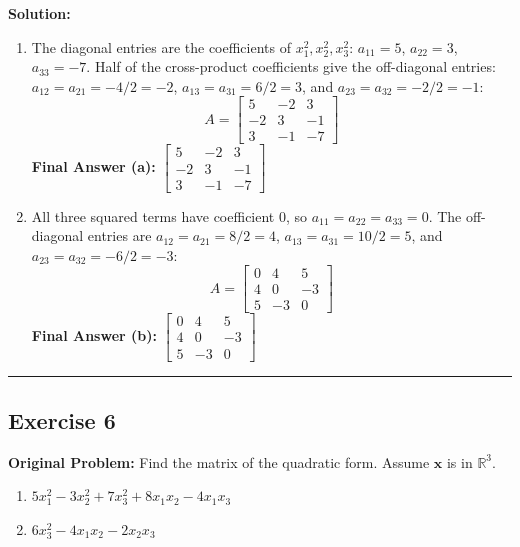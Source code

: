 \documentclass[11pt, letterpaper]{article}
\theoremstyle{definition}
\theoremstyle{remark}
\begin{document}
\textbf{Solution:}
\begin{enumerate}[label=\alph*.]
    \item The diagonal entries are the coefficients of $x_1^2, x_2^2, x_3^2$: $a_{11} = 5$, $a_{22} = 3$, $a_{33} = -7$. Half of the cross-product coefficients give the off-diagonal entries: $a_{12} = a_{21} = -4/2 = -2$, $a_{13} = a_{31} = 6/2 = 3$, and $a_{23} = a_{32} = -2/2 = -1$:
    \[
    A = \begin{bmatrix} 5 & -2 & 3 \\ -2 & 3 & -1 \\ 3 & -1 & -7 \end{bmatrix}
    \]
    \textbf{Final Answer (a):} $\begin{bmatrix} 5 & -2 & 3 \\ -2 & 3 & -1 \\ 3 & -1 & -7 \end{bmatrix}$

    \item All three squared terms have coefficient $0$, so $a_{11} = a_{22} = a_{33} = 0$. The off-diagonal entries are $a_{12} = a_{21} = 8/2 = 4$, $a_{13} = a_{31} = 10/2 = 5$, and $a_{23} = a_{32} = -6/2 = -3$:
    \[
    A = \begin{bmatrix} 0 & 4 & 5 \\ 4 & 0 & -3 \\ 5 & -3 & 0 \end{bmatrix}
    \]
    \textbf{Final Answer (b):} $\begin{bmatrix} 0 & 4 & 5 \\ 4 & 0 & -3 \\ 5 & -3 & 0 \end{bmatrix}$
\end{enumerate}

\medskip\hrule\medskip

\subsection*{Exercise 6}
\textbf{Original Problem:} Find the matrix of the quadratic form. Assume $\mathbf{x}$ is in $\mathbb{R}^3$.
\begin{enumerate}[label=\alph*.]
    \item $5x_1^2 - 3x_2^2 + 7x_3^2 + 8x_1x_2 - 4x_1x_3$
    \item $6x_3^2 - 4x_1x_2 - 2x_2x_3$
\end{enumerate}
\end{document}
